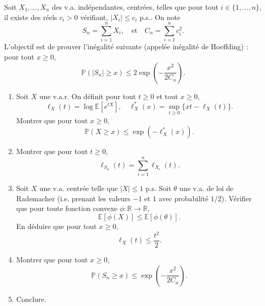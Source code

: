 \begin{mdframed}
\begin{exercice}
Soit $X_1, \dots, X_n$ des v.a. indépendantes, centrées, telles que pour tout $i \in \{1, \dots, n\}$, il existe des réels $c_i > 0$ vérifiant, $|X_i| \le c_i$ p.s.. On note
\begin{equation*}
S_n = \sum_{i=1}^n X_i, \quad \text{et} \quad C_n = \sum_{i=1}^n c_i^2.
\end{equation*}
L'objectif est de prouver l'inégalité suivante (appelée inégalité de Hoeffding) : pour tout $x \ge 0$,
\begin{equation*}
\mathbb{P}(|S_n| \ge x) \le 2 \exp \left( -\frac{x^2}{2C_n} \right).
\end{equation*}
\begin{enumerate}
    \item Soit $X$ une v.a.r. On définit pour tout $t \ge 0$ et tout $x \ge 0$,
    \begin{equation*}
    \ell_X(t) = \log \mathbb{E}\left[e^{tX}\right], \quad \ell_X^*(x) = \sup_{t \ge 0} \{xt - \ell_X(t)\}.
    \end{equation*}
    Montrer que pour tout $x \ge 0$,
    \begin{equation*}
    \mathbb{P}(X \ge x) \le \exp\left(-\ell_X^*(x)\right).
    \end{equation*}
    
    \item Montrer que pour tout $t \ge 0$,
    \begin{equation*}
    \ell_{S_n}(t) = \sum_{i=1}^n \ell_{X_i}(t).
    \end{equation*}
    
    \item Soit $X$ une v.a. centrée telle que $|X| \le 1$ p.s. Soit $\theta$ une v.a. de loi de Rademacher (i.e. prenant les valeurs $-1$ et $1$ avec probabilité $1/2$). Vérifier que pour toute fonction convexe $\phi : \mathbb{R} \to \mathbb{R}$,
    \begin{equation*}
    \mathbb{E}[\phi(X)] \le \mathbb{E}[\phi(\theta)].
    \end{equation*}
    En déduire que pour tout $x \ge 0$,
    \begin{equation*}
    \ell_X(t) \le \frac{t^2}{2}.
    \end{equation*}
    
    \item Montrer que pour tout $x \ge 0$,
    \begin{equation*}
    \mathbb{P}(S_n \ge x) \le \exp \left(-\frac{x^2}{2C_n}\right).
    \end{equation*}
    \item Conclure.
\end{enumerate}
\end{exercice}
\end{mdframed}

